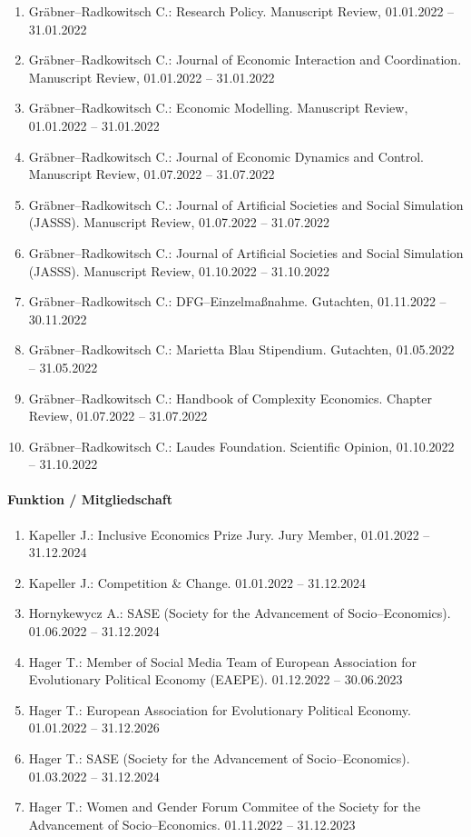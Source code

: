 \begin{enumerate}[leftmargin=*, labelsep=0.5cm]
\item Gräbner--Radkowitsch C.: Research Policy. Manuscript Review, 01.01.2022 -- 31.01.2022
\item Gräbner--Radkowitsch C.: Journal of Economic Interaction and Coordination. Manuscript Review, 01.01.2022 -- 31.01.2022
\item Gräbner--Radkowitsch C.: Economic Modelling. Manuscript Review, 01.01.2022 -- 31.01.2022
\item Gräbner--Radkowitsch C.: Journal of Economic Dynamics and Control. Manuscript Review, 01.07.2022 -- 31.07.2022
\item Gräbner--Radkowitsch C.: Journal of Artificial Societies and Social Simulation (JASSS). Manuscript Review, 01.07.2022 -- 31.07.2022
\item Gräbner--Radkowitsch C.: Journal of Artificial Societies and Social Simulation (JASSS). Manuscript Review, 01.10.2022 -- 31.10.2022
\item Gräbner--Radkowitsch C.: DFG--Einzelmaßnahme. Gutachten, 01.11.2022 -- 30.11.2022
\item Gräbner--Radkowitsch C.: Marietta Blau Stipendium. Gutachten, 01.05.2022 -- 31.05.2022
\item Gräbner--Radkowitsch C.: Handbook of Complexity Economics. Chapter Review, 01.07.2022 -- 31.07.2022
\item Gräbner--Radkowitsch C.: Laudes Foundation. Scientific Opinion, 01.10.2022 -- 31.10.2022
\end{enumerate}

\paragraph{Funktion / Mitgliedschaft}
\begin{enumerate}[leftmargin=*, labelsep=0.5cm]
\item Kapeller J.: Inclusive Economics Prize Jury. Jury Member, 01.01.2022 -- 31.12.2024
\item Kapeller J.: Competition \& Change. 01.01.2022 -- 31.12.2024
\item Hornykewycz A.: SASE (Society for the Advancement of Socio--Economics). 01.06.2022 -- 31.12.2024
\item Hager T.: Member of Social Media Team of European Association for Evolutionary Political Economy (EAEPE). 01.12.2022 -- 30.06.2023
\item Hager T.: European Association for Evolutionary Political Economy. 01.01.2022 -- 31.12.2026
\item Hager T.: SASE (Society for the Advancement of Socio--Economics). 01.03.2022 -- 31.12.2024
\item Hager T.: Women and Gender Forum Commitee of the Society for the Advancement of Socio--Economics. 01.11.2022 -- 31.12.2023
\end{enumerate}
